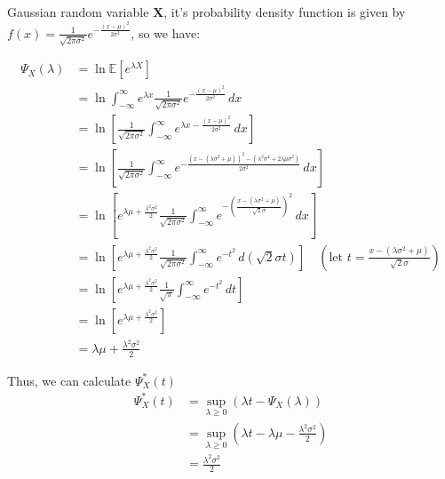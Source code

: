 \documentclass[a4paper, 12pt, titlepage]{article}
\begin{document}
Gaussian random variable $\mathbf{X}$, it's probability density function is given by $f(x) = \frac{1}{\sqrt{2 \pi \sigma^2}} e^{-\frac{ (x - \mu )^2 }{2 \sigma^2}}$, so we have:

\begin{equation}
    \begin{aligned}
        \Psi_{X}(\lambda) &= \ln \mathbb E \left[ e^{\lambda X} \right] \\
                          &= \ln \int_{- \infty}^{\infty} e^{\lambda x} \frac{1}{\sqrt{2 \pi \sigma^2}} e^{-\frac{ (x - \mu )^2 }{2 \sigma^2}} \, dx \\
                          &= \ln \left[ \frac{1}{\sqrt{2 \pi \sigma^2}} \int_{- \infty}^{\infty} e^{\lambda x - \frac{(x - \mu)^2}{2 \sigma^2}} \,dx \right] \\
                          &= \ln \left[ \frac{1}{\sqrt{2 \pi \sigma^2}} \int_{- \infty}^{\infty} e^{- \frac{\left( x - (\lambda \sigma^2 + \mu) \right)^2 - \left( \lambda^2 \sigma^4 + 2 \lambda \mu \sigma^2 \right)}{2 \sigma^2}} \, dx \right] \\
                          &= \ln \left[ e^{\lambda \mu + \frac{\lambda^2 \sigma^2}{2}} \frac{1}{ \sqrt{2 \pi \sigma^2}} \int_{- \infty}^{\infty} e^{- \left( \frac{x - (\lambda \sigma^2 + \mu)}{ \sqrt{2} \sigma } \right)^2 } \, dx \right] \\
                          &= \ln \left[ e^{\lambda \mu + \frac{\lambda^2 \sigma^2}{2}} \frac{1}{ \sqrt{2 \pi \sigma^2}} \int_{- \infty}^{\infty} e^{- t^2 } \, d \left( \sqrt{2} \sigma t \right) \right] \quad \left(\text{let } t = \frac{x - (\lambda \sigma^2 + \mu)}{ \sqrt{2} \sigma } \right)\\
                          &= \ln \left[ e^{\lambda \mu + \frac{\lambda^2 \sigma^2}{2}} \frac{1}{\sqrt{\pi}} \int_{- \infty}^{\infty} e^{- t^2 } \, dt \right] \\
                          &= \ln \left[ e^{\lambda \mu + \frac{\lambda^2 \sigma^2}{2}} \right] \\
                          &= \lambda \mu + \frac{\lambda^2 \sigma^2}{2}
    \end{aligned}
\end{equation}

Thus, we can calculate $\Psi_{X}^{*}(t)$
\begin{equation}
    \begin{aligned}
        \Psi_{X}^{*}(t) &= \sup_{\lambda \geq 0} \left( \lambda t - \Psi_{X}(\lambda) \right) \\
                        &= \sup_{\lambda \geq 0} \left( \lambda t - \lambda \mu - \frac{\lambda^2 \sigma^2}{2} \right) \\
                        &= \frac{ \lambda^2 \sigma^2 }{2}
    \end{aligned}
\end{equation}
\end{document}
